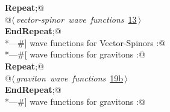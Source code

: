 \documentclass[a4paper,12pt]{amsart}
\renewcommand{\NWlink}[2]{\hyperlink{#1}{#2}}
\renewcommand{\NWsep}{${\diamond}$}
\begin{document}
\begin{flushleft}
\begin{list}{}{}
\mbox{}\verb@@\hbox{\sffamily\bfseries Repeat}\verb@;@\\
\mbox{}\verb@   @\hbox{$\langle\,${\itshape vector-spinor wave functions}\nobreak\ {\footnotesize \NWlink{nuweb13}{13}}$\,\rangle$}\verb@@\\
\mbox{}\verb@@\hbox{\sffamily\bfseries EndRepeat}\verb@;@\\
\mbox{}\verb@*---#] wave functions for Vector-Spinors :@\\
\mbox{}\verb@*---#[ wave functions for gravitons :@\\
\mbox{}\verb@@\hbox{\sffamily\bfseries Repeat}\verb@;@\\
\mbox{}\verb@   @\hbox{$\langle\,${\itshape graviton wave functions}\nobreak\ {\footnotesize \NWlink{nuweb19b}{19b}}$\,\rangle$}\verb@@\\
\mbox{}\verb@@\hbox{\sffamily\bfseries EndRepeat}\verb@;@\\
\mbox{}\verb@*---#] wave functions for gravitons :@\\
\mbox{}\verb@@{\NWsep}
\end{list}
\vspace{-1.5ex}
\footnotesize
\begin{list}{}{\setlength{\itemsep}{-\parsep}\setlength{\itemindent}{-\leftmargin}}

\item{}
\end{list}
\vspace{4ex}
\end{flushleft}
\end{document}

